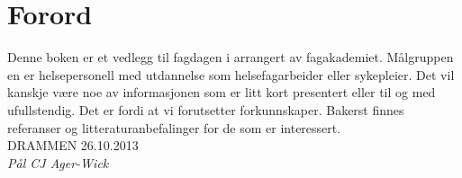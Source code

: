 		\chapter{Forord}%
				Denne boken er et vedlegg til fagdagen i arrangert av fagakademiet. Målgruppen en er helsepersonell med utdannelse som helsefagarbeider eller sykepleier. Det vil kanskje være noe av informasjonen som er litt kort presentert eller til og med ufullstendig. Det er fordi at vi forutsetter forkunnskaper. Bakerst finnes referanser og litteraturanbefalinger for de som er interessert.
				\\[0.7in]



				DRAMMEN 26.10.2013\\[0.4in]

				\emph{Pål CJ Ager-Wick}

	\newpage
	\tableofcontents